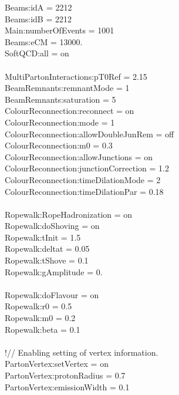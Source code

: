 Beams:idA = 2212
\\Beams:idB = 2212
\\Main:numberOfEvents = 1001
\\Beams:eCM = 13000.
\\SoftQCD:all = on
\\
\\MultiPartonInteractions:pT0Ref = 2.15
\\BeamRemnants:remnantMode = 1
\\BeamRemnants:saturation = 5
\\ColourReconnection:reconnect = on
\\ColourReconnection:mode = 1
\\ColourReconnection:allowDoubleJunRem = off
\\ColourReconnection:m0 = 0.3
\\ColourReconnection:allowJunctions = on
\\ColourReconnection:junctionCorrection = 1.2
\\ColourReconnection:timeDilationMode = 2
\\ColourReconnection:timeDilationPar = 0.18
\\
\\Ropewalk:RopeHadronization = on
\\Ropewalk:doShoving = on
\\Ropewalk:tInit = 1.5 %
\\Ropewalk:deltat = 0.05
\\Ropewalk:tShove = 0.1
\\Ropewalk:gAmplitude = 0. %
\\
\\Ropewalk:doFlavour = on
\\Ropewalk:r0 = 0.5
\\Ropewalk:m0 = 0.2
\\Ropewalk:beta = 0.1
\\
\\!// Enabling setting of vertex information.
\\PartonVertex:setVertex = on
\\PartonVertex:protonRadius = 0.7
\\PartonVertex:emissionWidth = 0.1


